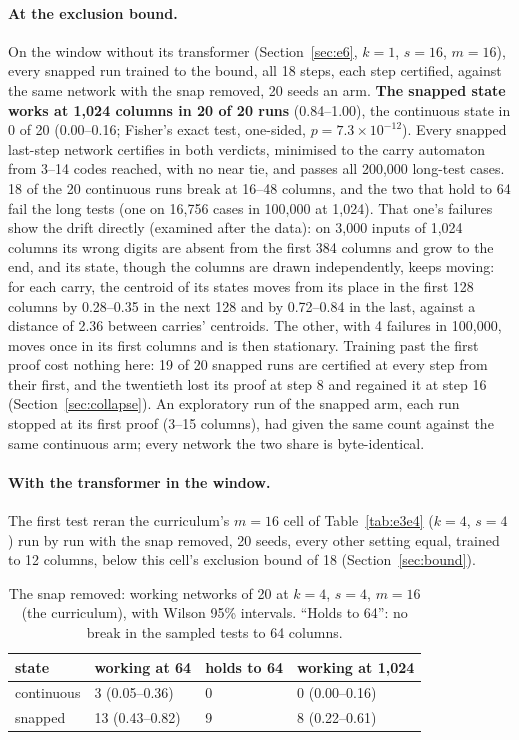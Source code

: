 \documentclass[11pt]{article}
\begin{document}
\paragraph{At the exclusion bound.} On the window without its transformer (Section~\ref{sec:e6},
$k = 1$, $s = 16$, $m = 16$), every snapped run trained to the bound, all 18 steps, each step
certified, against the same network with the snap removed, 20 seeds an arm. \textbf{The snapped
state works at 1{,}024 columns in 20 of 20 runs} (0.84--1.00), the continuous state in 0 of 20
(0.00--0.16; Fisher's exact test, one-sided, $p = 7.3 \times 10^{-12}$). Every snapped last-step
network certifies in both verdicts, minimised to the carry automaton from 3--14 codes reached, with
no near tie, and passes all 200{,}000 long-test cases. 18 of the 20 continuous runs break at
16--48 columns, and the two that hold to 64 fail the long tests (one on 16{,}756 cases in 100{,}000
at 1{,}024). That one's failures show the drift directly (examined after the data): on 3{,}000 inputs of 1{,}024 columns its wrong digits
are absent from the first 384 columns and grow to the end, and its state, though the columns are
drawn independently, keeps moving: for each carry, the centroid of its states moves from its place
in the first 128 columns by 0.28--0.35 in the next 128 and by 0.72--0.84 in the last, against a
distance of 2.36 between carries' centroids. The other, with 4 failures in 100{,}000, moves once in
its first columns and is then stationary. Training past the first proof cost nothing here: 19 of 20 snapped runs are certified at every
step from their first, and the twentieth lost its proof at step 8 and regained it at step 16
(Section~\ref{sec:collapse}). An exploratory run of the snapped arm, each run stopped at its first
proof (3--15 columns), had given the same count against the same continuous arm; every network the
two share is byte-identical.

\paragraph{With the transformer in the window.} The first test reran the curriculum's $m = 16$
cell of Table~\ref{tab:e3e4} ($k = 4$, $s = 4$) run by run with the snap removed, 20 seeds, every
other setting equal, trained to 12 columns, below this cell's exclusion bound of 18
(Section~\ref{sec:bound}).

\begin{table}[t]
\centering
\caption{The snap removed: working networks of 20 at $k=4$, $s=4$, $m=16$ (the curriculum), with
Wilson 95\% intervals. ``Holds to 64'': no break in the sampled tests to 64 columns.}
\label{tab:e2}
\begin{tabular}{llll}
\toprule
state & working at 64 & holds to 64 & working at 1{,}024 \\
\midrule
continuous & 3 (0.05--0.36) & 0 & 0 (0.00--0.16) \\
snapped & 13 (0.43--0.82) & 9 & 8 (0.22--0.61) \\
\bottomrule
\end{tabular}
\end{table}
\end{document}
